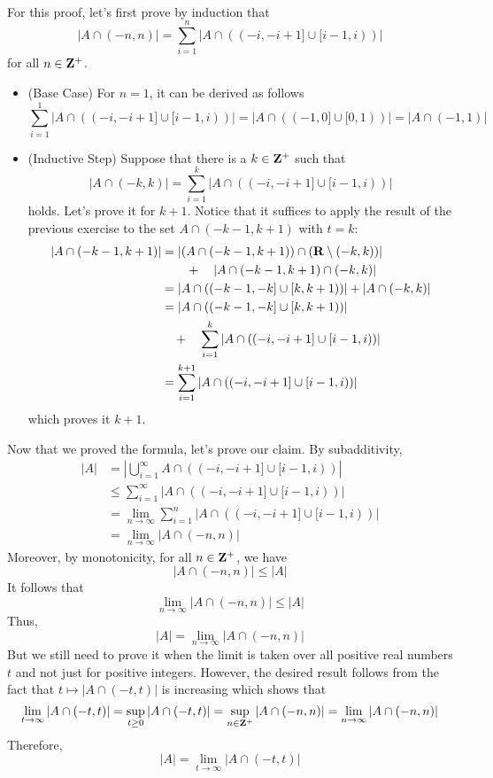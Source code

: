\begin{solution}
    \\ For this proof, let's first prove by induction that 
    $$|A\cap (-n, n)| = \sum_{i=1}^{n}|A \cap ((-i, -i+1]\cup[i-1, i))|$$
    for all $n \in \mathbf{Z}^+$.
    \begin{itemize}
        \item (Base Case) For $n = 1$, it can be derived as follows
        $$\sum_{i=1}^{1}|A \cap ((-i, -i+1]\cup[i-1, i))| = |A \cap ((-1, 0]\cup[0, 1))| = |A \cap (-1, 1)|$$
        \item (Inductive Step) Suppose that there is a $k \in \mathbf{Z}^+$ such that 
        $$|A\cap (-k, k)| = \sum_{i=1}^{k}|A \cap ((-i, -i+1]\cup[i-1, i))|$$
        holds. Let's prove it for $k+1$. Notice that it suffices to apply the result of the previous exercise to the set $A \cap (-k-1, k+1)$ with $t = k$:
        \begin{align*}
            |A \cap (-k-1, k+1)| &= |(A \cap (-k-1, k+1)) \cap (\mathbf{R} \setminus (-k, k))| \\
            & \qquad  + \quad |A \cap (-k-1, k+1) \cap (-k, k)| \\
            &= |A \cap ((-k-1, -k] \cup [k, k+1))| + |A \cap (-k, k)|\\
            &= |A \cap ((-k-1, -k] \cup [k, k+1))| \\
            & \quad + \quad \sum_{i=1}^{k}|A \cap ((-i, -i+1]\cup[i-1, i))|\\
            &= \sum_{i=1}^{k+1}|A \cap ((-i, -i+1]\cup[i-1, i))|
        \end{align*}
        which proves it $k+1$.
    \end{itemize}
    Now that we proved the formula, let's prove our claim. By subadditivity, 
    \begin{align*}
        |A| &= \left| \bigcup_{i=1}^{\infty}A\cap ((-i, -i+1]\cup[i-1, i)) \right| \\
        &\leq \sum_{i=1}^{\infty}|A \cap ((-i, -i+1]\cup[i-1, i))| \\
        &= \lim_{n \rightarrow \infty} \sum_{i=1}^{n}|A \cap ((-i, -i+1]\cup[i-1, i))| \\
        &= \lim_{n \rightarrow \infty} |A \cap (-n, n)|
    \end{align*}
    Moreover, by monotonicity, for all $n \in \mathbf{Z}^+$, we have
    $$|A \cap (-n, n)| \leq |A|$$
    It follows that
    $$\lim_{n \rightarrow \infty} |A \cap (-n, n)| \leq |A|$$
    Thus,
    $$|A| = \lim_{n \rightarrow \infty}|A \cap (-n, n)|$$
    But we still need to prove it when the limit is taken over all positive real numbers $t$ and not just for positive integers. However, the desired result follows from the fact that $t \mapsto |A \cap (-t,t)|$ is increasing which shows that
    $$\lim_{t \rightarrow \infty}|A \cap (-t,t)| = \sup_{t \geq 0}|A \cap (-t,t)| = \sup_{n \in \mathbf{Z}^+}|A \cap (-n,n)|= \lim_{n \rightarrow \infty}|A \cap (-n,n)|$$
    Therefore,
    $$|A| = \lim_{t \rightarrow \infty}|A \cap (-t, t)|$$ \\
\end{solution}

